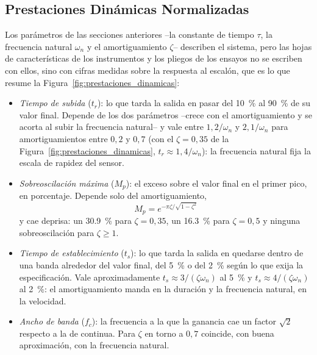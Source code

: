 \subsection{Prestaciones Dinámicas Normalizadas}\label{sub:prestaciones_dinamicas}

Los parámetros de las secciones anteriores --la constante de tiempo $\tau$, la frecuencia natural $\omega_n$ y el amortiguamiento $\zeta$-- describen el sistema, pero las hojas de características de los instrumentos y los pliegos de los ensayos no se escriben con ellos, sino con cifras medidas sobre la respuesta al escalón, que es lo que resume la Figura~\ref{fig:prestaciones_dinamicas}:

\begin{itemize}
    \item \emph{Tiempo de subida} ($t_r$): lo que tarda la salida en pasar del \SI{10}{\percent} al \SI{90}{\percent} de su valor final. Depende de los dos parámetros --crece con el amortiguamiento y se acorta al subir la frecuencia natural-- y vale entre $1{,}2/\omega_n$ y $2{,}1/\omega_n$ para amortiguamientos entre $0{,}2$ y $0{,}7$ (con el $\zeta = 0{,}35$ de la Figura~\ref{fig:prestaciones_dinamicas}, $t_r \approx 1{,}4/\omega_n$): la frecuencia natural fija la escala de rapidez del sensor.
    \item \emph{Sobreoscilación máxima} ($M_p$): el exceso sobre el valor final en el primer pico, en porcentaje. Depende solo del amortiguamiento,
\begin{equation}\label{eq:sobreoscilacion}
    M_p = e^{-\pi\zeta/\sqrt{1-\zeta^2}}
\end{equation}
y cae deprisa: un \SI{30.9}{\percent} para $\zeta = 0{,}35$, un \SI{16.3}{\percent} para $\zeta = 0{,}5$ y ninguna sobreoscilación para $\zeta \ge 1$.
    \item \emph{Tiempo de establecimiento} ($t_s$): lo que tarda la salida en quedarse dentro de una banda alrededor del valor final, del \SI{5}{\percent} o del \SI{2}{\percent} según lo que exija la especificación. Vale aproximadamente $t_s \approx 3/(\zeta\omega_n)$ al \SI{5}{\percent} y $t_s \approx 4/(\zeta\omega_n)$ al \SI{2}{\percent}: el amortiguamiento manda en la duración y la frecuencia natural, en la velocidad.
    \item \emph{Ancho de banda} ($f_c$): la frecuencia a la que la ganancia cae un factor $\sqrt{2}$ respecto a la de continua. Para $\zeta$ en torno a $0{,}7$ coincide, con buena aproximación, con la frecuencia natural.
\end{itemize}

